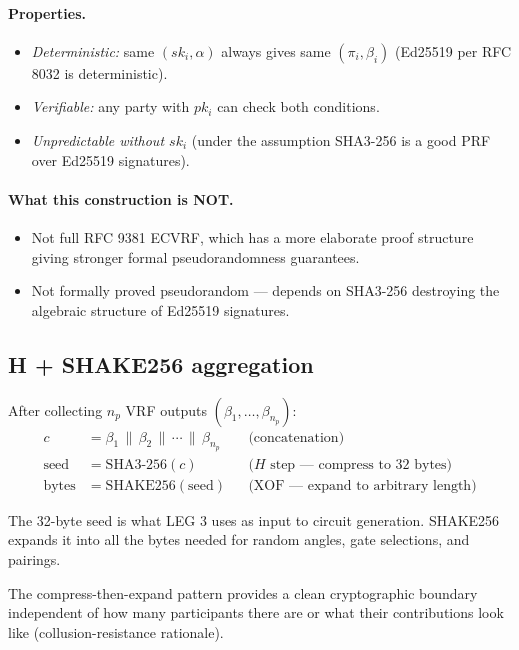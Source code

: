 \documentclass[11pt,a4paper]{article}
\theoremstyle{plain}
\theoremstyle{definition}
\theoremstyle{remark}
\begin{document}
\paragraph{Properties.}
\begin{itemize}[itemsep=2pt,topsep=2pt]
  \item \emph{Deterministic:} same $(sk_i, \alpha)$ always gives same $(\pi_i, \beta_i)$ (Ed25519 per RFC 8032 is deterministic).
  \item \emph{Verifiable:} any party with $pk_i$ can check both conditions.
  \item \emph{Unpredictable without $sk_i$} (under the assumption SHA3-256 is a good PRF over Ed25519 signatures).
\end{itemize}

\paragraph{What this construction is NOT.}
\begin{itemize}[itemsep=2pt,topsep=2pt]
  \item Not full RFC 9381 ECVRF, which has a more elaborate proof structure giving stronger formal pseudorandomness guarantees.
  \item Not formally proved pseudorandom --- depends on SHA3-256 destroying the algebraic structure of Ed25519 signatures.
\end{itemize}

\subsection{H + SHAKE256 aggregation}

After collecting $n_p$ VRF outputs $(\beta_1, \ldots, \beta_{n_p})$:
\begin{align}
c &= \beta_1 \,\|\, \beta_2 \,\|\, \cdots \,\|\, \beta_{n_p} && \text{(concatenation)} \\
\text{seed} &= \mathrm{SHA3\text{-}256}(c) && \text{($H$ step --- compress to 32 bytes)} \\
\text{bytes} &= \mathrm{SHAKE256}(\text{seed}) && \text{(XOF --- expand to arbitrary length)}
\end{align}

The 32-byte seed is what LEG 3 uses as input to circuit generation. SHAKE256 expands it into all the bytes needed for random angles, gate selections, and pairings.

The compress-then-expand pattern provides a clean cryptographic boundary independent of how many participants there are or what their contributions look like (collusion-resistance rationale).
\end{document}
